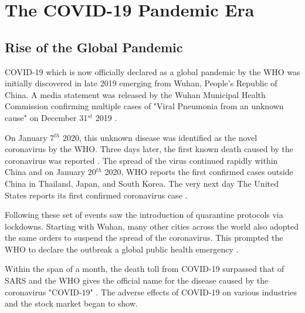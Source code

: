 
\chapter{The COVID-19 Pandemic Era} \label{The COVID-19 Pandemic Era} %


\section*{Rise of the Global Pandemic}

COVID-19 which is now officially declared as a global pandemic by the WHO was 
initially discovered in late 2019 emerging from Wuhan, People’s Republic of China.
A media statement was released by the Wuhan Municipal Health Commission confirming
multiple cases of "Viral Pneumonia from an unknown cause" on December 31$^{st}$ 2019 \cite{WMC2020}.

On January 7$^{th}$ 2020, this unknown disease was identified as the novel coronavirus by the WHO.
Three days later, the first known death caused by the coronavirus was reported \cite{WHOa2020}. The 
spread of the virus continued rapidly within China and on January 20$^{th}$ 2020, WHO reports 
the first confirmed cases outside China in Thailand, Japan, and South Korea. The very next day 
The United States reports its first confirmed coronavirus case \cite{EDW2020}. 

Following these set of events saw the introduction of quarantine protocols via lockdowns. 
Starting with Wuhan, many other cities across the world also adopted the same orders to 
suspend the spread of the coronavirus. This prompted the WHO to declare the outbreak a global public health emergency \cite{EDWa2020}. 

Within the span of a month, the death toll from COVID-19 surpassed that of SARS 
and the WHO gives the official name for the disease caused by the coronavirus "COVID-19" \cite{MCM2020}. 
The adverse effects of COVID-19 on various industries and the stock market began to 
show.

